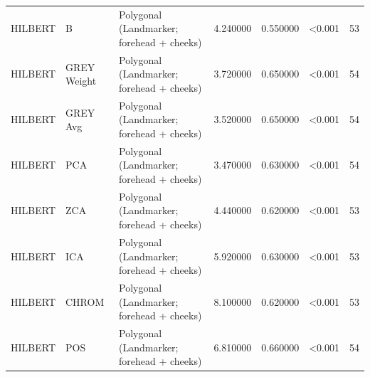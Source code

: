\begin{table}[htbp]
\begin{tabular}{l l l r r l r}
HILBERT & B & Polygonal (Landmarker; forehead + cheeks) & 4.240000 & 0.550000 & <0.001 & 53 \\
HILBERT & GREY Weight & Polygonal (Landmarker; forehead + cheeks) & 3.720000 & 0.650000 & <0.001 & 54 \\
HILBERT & GREY Avg & Polygonal (Landmarker; forehead + cheeks) & 3.520000 & 0.650000 & <0.001 & 54 \\
HILBERT & PCA & Polygonal (Landmarker; forehead + cheeks) & 3.470000 & 0.630000 & <0.001 & 54 \\
HILBERT & ZCA & Polygonal (Landmarker; forehead + cheeks) & 4.440000 & 0.620000 & <0.001 & 53 \\
HILBERT & ICA & Polygonal (Landmarker; forehead + cheeks) & 5.920000 & 0.630000 & <0.001 & 53 \\
HILBERT & CHROM & Polygonal (Landmarker; forehead + cheeks) & 8.100000 & 0.620000 & <0.001 & 53 \\
HILBERT & POS & Polygonal (Landmarker; forehead + cheeks) & 6.810000 & 0.660000 & <0.001 & 54 \\
\bottomrule
\end{tabular}

\end{table}
